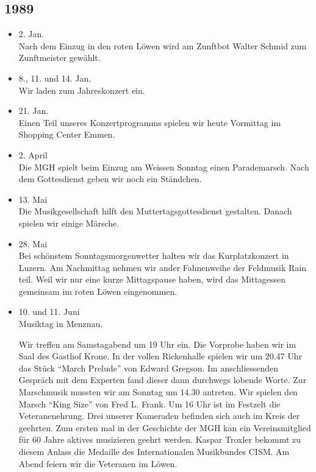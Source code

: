 \subsection*{1989}

\begin{history}


    \begin{itemize}

        \item 2. Jan.\\
              Nach dem Einzug in den roten Löwen wird am Zunftbot Walter Schmid zum
              Zunftmeister gewählt.

        \item 8., 11. und 14. Jan.\\
              Wir laden zum Jahreskonzert ein.

        \item 21. Jan.\\
              Einen Teil unseres Konzertprogramms spielen wir heute Vormittag im
              Shopping Center Emmen.

        \item 2. April\\
              Die MGH spielt beim Einzug am Weissen Sonntag einen Parademarsch. Nach
              dem Gottesdienst geben wir noch ein Ständchen.

        \item 13. Mai\\
              Die Musikgesellschaft hilft den Muttertagsgottesdienst gestalten. Danach
              spielen wir einige Märsche.

        \item 28. Mai\\
              Bei schönstem Sonntagsmorgenwetter halten wir das Kurplatzkonzert in
              Luzern. Am Nachmittag nehmen wir ander Fahnenweihe der Feldmusik Rain
              teil. Weil wir nur eine kurze Mittagspause haben, wird das Mittagessen
              gemeinsam im roten Löwen eingenommen.

        \item 10. und 11. Juni\\
              Musiktag in Menznau.

              Wir treffen am Samstagabend um 19 Uhr ein. Die
              Vorprobe haben wir im Saal des Gasthof Krone. In der vollen Rickenhalle
              spielen wir um 20.47 Uhr das Stück \enquote{March Prelude} von Edward
              Gregson. Im anschliessenden Gespräch mit dem Experten fand dieser dann
              durchwegs lobende Worte. Zur Marschmusik mussten wir am Sonntag um 14.30
              antreten. Wir spielen den Marsch \enquote{King Size} von Fred L. Frank.
              Um 16 Uhr ist im Festzelt die Veteranenehrung. Drei unserer Kameraden
              befinden sich auch im Kreis der geehrten. Zum ersten mal in der
              Geschichte der MGH kan ein Vereinsmitglied für 60 Jahre aktives
              musizieren geehrt werden. Kaspar Troxler bekommt zu diesem Anlass die
              Medaille des Internationalen Musikbundes CISM. Am Abend feiern wir die
              Veteranen im Löwen.


\end{itemize}
\end{history}
